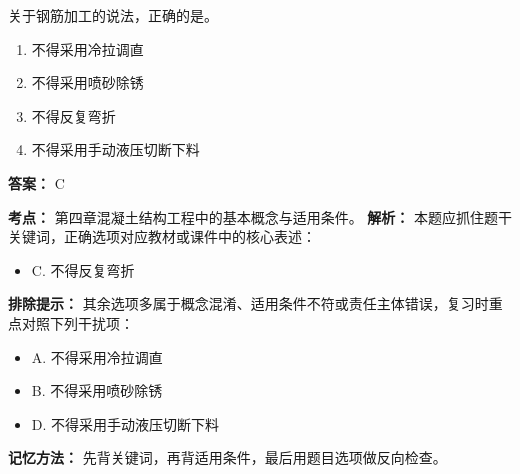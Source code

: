 \documentclass[UTF8,fontset=fandol,11pt]{ctexart}
\begin{document}
\begin{quizbox}[title={第 31 题}]
关于钢筋加工的说法，正确的是。\\
\begin{enumerate}[label=\Alph*.]
\item 不得采用冷拉调直
\item 不得采用喷砂除锈
\item 不得反复弯折
\item 不得采用手动液压切断下料
\end{enumerate}
\textbf{答案：} C
\vspace{0.25em}
\begin{answerbox}[title={考点解析}]
\textbf{考点：} 第四章混凝土结构工程中的基本概念与适用条件。
\textbf{解析：} 本题应抓住题干关键词，正确选项对应教材或课件中的核心表述：
\begin{itemize}
\item C. 不得反复弯折
\end{itemize}
\textbf{排除提示：} 其余选项多属于概念混淆、适用条件不符或责任主体错误，复习时重点对照下列干扰项：
\begin{itemize}
\item A. 不得采用冷拉调直
\item B. 不得采用喷砂除锈
\item D. 不得采用手动液压切断下料
\end{itemize}
\textbf{记忆方法：} 先背关键词，再背适用条件，最后用题目选项做反向检查。
\end{answerbox}
\end{quizbox}
\end{document}
